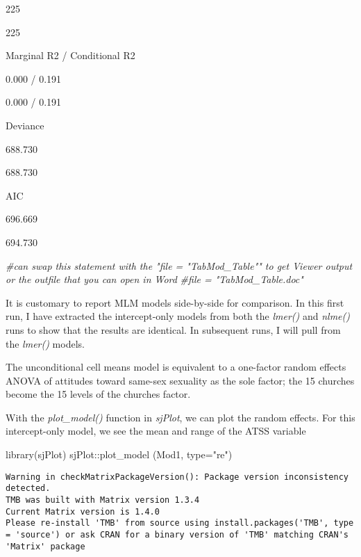 \documentclass[
  11pt,
]{book}
\newenvironment{Shaded}{\begin{snugshade}}{\end{snugshade}}
\newcommand{\AttributeTok}[1]{\textcolor[rgb]{0.77,0.63,0.00}{#1}}
\newcommand{\CommentTok}[1]{\textcolor[rgb]{0.56,0.35,0.01}{\textit{#1}}}
\newcommand{\FunctionTok}[1]{\textcolor[rgb]{0.00,0.00,0.00}{#1}}
\newcommand{\NormalTok}[1]{#1}
\newcommand{\SpecialCharTok}[1]{\textcolor[rgb]{0.00,0.00,0.00}{#1}}
\newcommand{\StringTok}[1]{\textcolor[rgb]{0.31,0.60,0.02}{#1}}
\begin{document}
225

225

Marginal R2 / Conditional R2

0.000 / 0.191

0.000 / 0.191

Deviance

688.730

688.730

AIC

696.669

694.730

\begin{Shaded}
\begin{Highlighting}[]
\CommentTok{\#can swap this statement with the "file = "TabMod\_Table"" to get Viewer output or the outfile that you can open in Word}
\CommentTok{\#file = "TabMod\_Table.doc"}
\end{Highlighting}
\end{Shaded}

It is customary to report MLM models side-by-side for comparison. In this first run, I have extracted the intercept-only models from both the \emph{lmer()} and \emph{nlme()} runs to show that the results are identical. In subsequent runs, I will pull from the \emph{lmer()} models.

The unconditional cell means model is equivalent to a one-factor random effects ANOVA of attitudes toward same-sex sexuality as the sole factor; the 15 churches become the 15 levels of the churches factor.

With the \emph{plot\_model()} function in \emph{sjPlot}, we can plot the random effects. For this intercept-only model, we see the mean and range of the ATSS variable

\begin{Shaded}
\begin{Highlighting}[]
\FunctionTok{library}\NormalTok{(sjPlot)}
\NormalTok{sjPlot}\SpecialCharTok{::}\FunctionTok{plot\_model}\NormalTok{ (Mod1, }\AttributeTok{type=}\StringTok{"re"}\NormalTok{)}
\end{Highlighting}
\end{Shaded}

\begin{verbatim}
Warning in checkMatrixPackageVersion(): Package version inconsistency detected.
TMB was built with Matrix version 1.3.4
Current Matrix version is 1.4.0
Please re-install 'TMB' from source using install.packages('TMB', type = 'source') or ask CRAN for a binary version of 'TMB' matching CRAN's 'Matrix' package
\end{verbatim}
\end{document}
